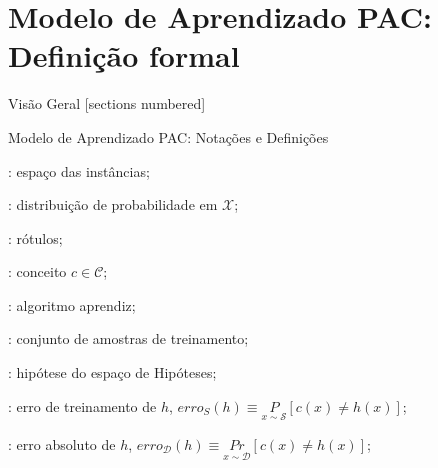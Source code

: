 \documentclass[10pt, professionalfonts]{beamer}
\begin{document}
{
\AtBeginSection{}
\section{Modelo de Aprendizado PAC: Definição formal}
\begin{frame}{Visão Geral}
  [sections numbered]
  \tableofcontents[hideallsubsections]
\end{frame}
\begin{frame}{Modelo de Aprendizado PAC: Notações e Definições}
  \begin{description}\setlength\itemsep{1em}
    \item [$\mathcal{X}$]: espaço das instâncias;
    \item [$\mathcal{D}$]: distribuição de probabilidade em $\mathcal{X}$;
    \item [$\mathcal{Y}=\{0,1\}$]: rótulos;
    \item [$c:\mathcal{X}\to\mathcal{Y}$]: conceito $c \in \mathcal{C}$;
    \item [$\mathcal{A}$]: algoritmo aprendiz;
    \item [$S=\{(x_i, c(x_i))\}$]: conjunto de amostras de treinamento;
    \item [$h \in \mathcal{H}$]: hipótese do espaço de Hipóteses;
    \item [$erro_{S}(h)$]: erro de treinamento de $h$, $erro_{S}(h) \equiv \underset{x \sim \mathcal{S}}{P}[c(x) \neq h(x)]$;
    \item [$erro_{\mathcal{D}}(h)$]: erro absoluto de $h$, $erro_{\mathcal{D}}(h) \equiv \underset{x \sim \mathcal{D}}{Pr}[c(x) \neq h(x)]$;
    
  \end{description}
\end{frame}

}
\end{document}
